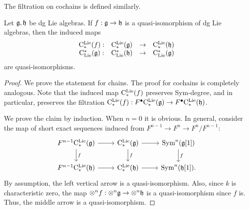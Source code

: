 \documentclass[11pt]{amsart}
\begin{document}
The filtration on cochains is defined similarly. 

\begin{lem}
Let $\mathfrak g,\mathfrak h$ be dg Lie algebras.
If $f : \mathfrak g \to \mathfrak h$ is a quasi-isomorphism of dg Lie algebras, then the induced maps
\[
\begin{array}{cccc}
{\rm C}^{\rm Lie}_*(f) : & {\rm C}^{\rm Lie}_*(\mathfrak g) & \to & {\rm C}^{\rm Lie}_*(\mathfrak h)\\
{\rm C}_{{\rm Lie}}^*(\mathfrak g) : & {\rm C}_{{\rm Lie}}^*(\mathfrak h) & \to & {\rm C}_{{\rm Lie}}^*(\mathfrak g) 
\end{array}
\]
are quasi-isomorphisms. 
\end{lem}
\begin{proof}
We prove the statement for chains.
The proof for cochains is completely analogous. 
Note that the induced map ${\rm C}^{\rm Lie}_*(f)$ preserves Sym-degree, and in particular, preserves the filtration ${\rm C}^{\rm Lie}_*(f) : F^\bullet {\rm C}^{\rm Lie}_*(\mathfrak g) \to F^\bullet {\rm C}^{\rm Lie}_*(\mathfrak h)$. 

We prove the claim by induction. 
When $n = 0$ it is obvious. 
In general, consider the map of short exact sequences induced from $F^{n-1} \to F^n \to F^n / F^{n-1}$:
\[
\begin{tikzcd}
F^{n-1} \clieu_* (\fg) \ar[r] \ar[d, "f"] & \clieu_*(\fg) \ar[r] \ar[d,"f"] & \Sym^n(\fg [1]) \ar[d, "f"] \\
F^{n-1} \clieu_* (\fh) \ar[r] & \clieu_*(\fh) \ar[r] & \Sym^n(\fh [1]) .
\end{tikzcd}
\]
By assumption, the left vertical arrow is a quasi-isomorphism.
Also, since $k$ is characteristic zero, the map $\otimes^n f : \otimes^n \mathfrak g \to \otimes^n \mathfrak h$ is a quasi-isomorphism since $f$ is. 
Thus, the middle arrow is a quasi-isomorphism.
\end{proof}


%  

\end{document}
